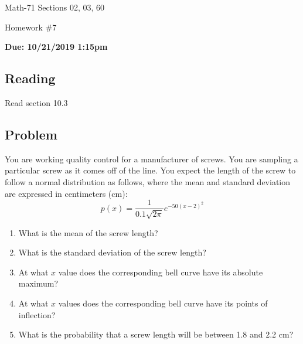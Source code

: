 \documentclass[letterpaper,12pt,fleqn]{article}
\begin{document}
\begin{center}
  \large
  Math-71 Sections 02, 03, 60

  \Large
  Homework \#7

  \large
  \textbf{Due: 10/21/2019 1:15pm}
\end{center}

\subsection*{Reading}

Read section 10.3

\subsection*{Problem}

You are working quality control for a manufacturer of screws.  You are sampling a particular screw as it comes off
of the line.  You expect the length of the screw to follow a normal distribution as follows, where the mean and
standard deviation are expressed in centimeters (cm):
\[p(x)=\frac{1}{0.1\sqrt{2\pi}}e^{-50(x-2)^2}\]
\begin{enumerate}
\item What is the mean of the screw length?
\item What is the standard deviation of the screw length?
\item At what \(x\) value does the corresponding bell curve have its absolute maximum?
\item At what \(x\) values does the corresponding bell curve have its points of inflection?
\item What is the probability that a screw length will be between 1.8 and 2.2 cm?
\end{enumerate}
\end{document}
